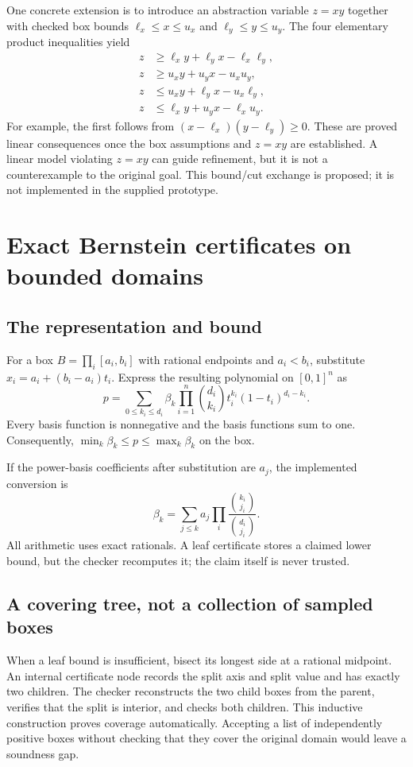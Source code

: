 \documentclass[11pt,a4paper]{article}
\begin{document}
One concrete extension is to introduce an abstraction variable $z=xy$ together
with checked box bounds $\ell_x\le x\le u_x$ and
$\ell_y\le y\le u_y$. The four elementary product inequalities yield
\begin{align*}
 z&\ge \ell_xy+\ell_yx-\ell_x\ell_y,\\
 z&\ge u_xy+u_yx-u_xu_y,\\
 z&\le u_xy+\ell_yx-u_x\ell_y,\\
 z&\le \ell_xy+u_yx-\ell_xu_y.
\end{align*}
For example, the first follows from $(x-\ell_x)(y-\ell_y)\ge0$.
These are proved linear consequences once the box assumptions and $z=xy$ are
established. A linear model violating $z=xy$ can guide refinement, but it is
not a counterexample to the original goal. This bound/cut exchange is proposed;
it is not implemented in the supplied prototype.

\section{Exact Bernstein certificates on bounded domains}
\label{sec:bernstein}

\subsection{The representation and bound}
For a box $B=\prod_i[a_i,b_i]$ with rational endpoints and $a_i<b_i$, substitute
$x_i=a_i+(b_i-a_i)t_i$. Express the resulting polynomial on $[0,1]^n$ as
\[
 p=\sum_{0\le k_i\le d_i}\beta_k
       \prod_{i=1}^n\binom{d_i}{k_i}t_i^{k_i}(1-t_i)^{d_i-k_i}.
\]
Every basis function is nonnegative and the basis functions sum to one.
Consequently, $\min_k\beta_k\le p\le\max_k\beta_k$ on the box.

If the power-basis coefficients after substitution are $a_j$, the implemented
conversion is
\[
 \beta_k=\sum_{j\le k} a_j
          \prod_i\frac{\binom{k_i}{j_i}}{\binom{d_i}{j_i}}.
\]
All arithmetic uses exact rationals. A leaf certificate stores a claimed lower
bound, but the checker recomputes it; the claim itself is never trusted.

\subsection{A covering tree, not a collection of sampled boxes}
When a leaf bound is insufficient, bisect its longest side at a rational
midpoint. An internal certificate node records the split axis and split value
and has exactly two children. The checker reconstructs the two child boxes
from the parent, verifies that the split is interior, and checks both children.
This inductive construction proves coverage automatically. Accepting a list
of independently positive boxes without checking that they cover the original
domain would leave a soundness gap.
\end{document}
